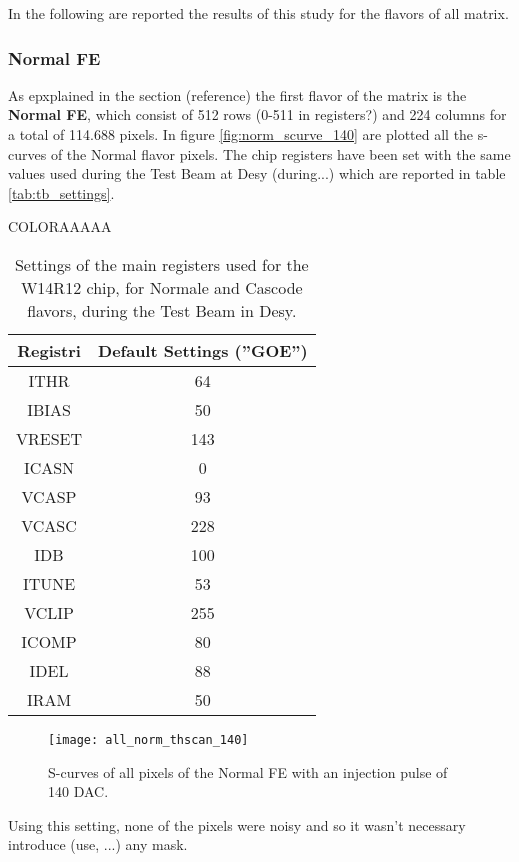 In the following are reported the results of this study for the flavors of all matrix.

\subsubsection{Normal FE}

As epxplained in the section (reference) the first flavor of the matrix is the \textbf{Normal FE}, which consist of 512 rows (0-511 in registers?) and 224 columns for a total of 114.688 pixels. In figure \vref{fig:norm_scurve_140} are plotted all the s-curves of the Normal flavor pixels. The chip registers have been set with the same values used during the Test Beam at Desy (during...) which are reported in table \vref{tab:tb_settings}.

COLORAAAAA

\begin{table}[h!]
\centering
\begin{tabular}{c|c}
Registri & Default Settings (''GOE'') \\
\hline
ITHR & 64 \\
\hline
IBIAS & 50 \\
\hline
VRESET & 143 \\
\hline
ICASN & 0 \\
\hline
VCASP & 93 \\
\hline
VCASC & 228 \\
\hline
IDB & 100 \\
\hline
ITUNE & 53 \\
\hline
VCLIP & 255 \\
\hline
ICOMP & 80 \\
\hline
IDEL & 88 \\
\hline
IRAM & 50 \\
\hline
\end{tabular}
\caption{Settings of the main registers used for the W14R12 chip, for Normale and Cascode flavors, during the Test Beam in Desy.}
\label{tab:tb_settings}
\end{table}

\begin{figure}[h!]
\centering
\texttt{[image: all\_norm\_thscan\_140]}
\caption{S-curves of all pixels of the Normal FE with an injection pulse of 140 DAC.}
\label{fig:norm_scurve_140}
\end{figure}

Using this setting, none of the pixels were noisy and so it wasn't necessary introduce (use, ...) any mask.

